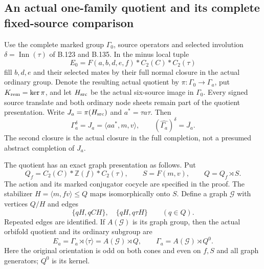 \subsection*{An actual one-family quotient and its complete fixed-source comparison}

\label{stmt:B139}
Use the complete marked group $\Gamma_0$, source operators and selected
involution $\delta=\operatorname{Inn}(\tau)$ of B.123 and B.135.
In the minus local tuple
\[
 E_0=F(a,b,d,e,f)*C_2(C)*C_2(\tau)
\]
fill $b,d,e$ and their selected mates by their full normal closure
in the actual ordinary group. Denote the resulting actual quotient by
$\pi:\Gamma_0\to\Gamma_a$, put $K_{\rm rem}=\ker\pi$, and let
$H_{\rm src}$ be the actual six-source image in $\Gamma_0$.
Every signed source translate and both ordinary node sheets remain
part of the quotient presentation. Write
$J_a=\pi(H_{\rm src})$ and $a^*=\tau a\tau$.
Then
\begin{equation}\label{eq:B139-main}
 \Gamma_a^\delta=J_a=\langle aa^*,m,v\rangle,\qquad
 (\widehat{\Gamma_a})^\delta=\overline{J_a}.
\end{equation}
The second closure is the actual closure in the full completion,
not a presumed abstract completion of $J_a$.

The quotient has an exact graph presentation as follows. Put
\[
 Q_f=C_2(C)*\mathbb Z(f)*C_2(\tau),\qquad S=F(m,v),\qquad Q=Q_f\rtimes S.
\]
The action and its marked conjugator cocycle are specified in the proof.
The stabilizer $H=\langle m,fv\rangle\leq Q$ maps isomorphically onto $S$.
Define a graph $\mathcal G$ with vertices $Q/H$ and edges
\begin{equation}\label{eq:B139-graph}
 \{qH,qCH\},\quad \{qH,q\tau H\}\qquad(q\in Q).
\end{equation}
Repeated edges are identified. If $A(\mathcal G)$ is its graph group,
then the actual orbifold quotient and its ordinary subgroup are
\begin{equation}\label{eq:B139-split}
 E_a=\Gamma_a\rtimes\langle\tau\rangle
       =A(\mathcal G)\rtimes Q,\qquad
 \Gamma_a=A(\mathcal G)\rtimes Q^0 .
\end{equation}
Here the original orientation is odd on both cones and even on $f,S$
and all graph generators; $Q^0$ is its kernel.

